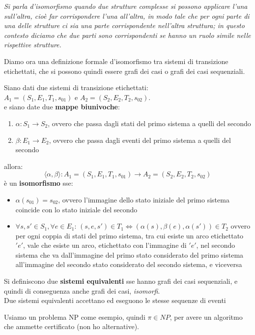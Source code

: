 \begin{shaded}
	\begin{center}
		\textit{Si parla d'isomorfismo quando due strutture complesse si possono
			applicare l'una sull'altra, cioè far corrispondere l'una all'altra, in modo
			tale che per ogni parte di una delle strutture ci sia una parte
			corrispondente nell'altra struttura; in questo contesto diciamo che due
			parti sono corrispondenti se hanno un ruolo simile nelle rispettive
		strutture.}
	\end{center}
	Diamo ora una definizione formale d'isomorfismo tra sistemi di transizione
	etichettati, che si possono quindi essere grafi dei casi o grafi dei casi
	sequenziali.
	\begin{definizione}
		Siano dati due sistemi di transizione etichettati:\\
		$A_1 = (S_1,E_1,T_1,s_{01})$ e $A_2 = (S_2 , E_2 , T_2 , s_{02})$.\\
		e siano date due \textbf{mappe biunivoche}:
		\begin{enumerate}
			\item $\alpha:S_1\to S_2$, ovvero che passa dagli stati del primo sistema a
			      quelli del secondo
			\item $\beta:E_1\to E_2$, ovvero che passa dagli eventi del primo sistema a
			      quelli del secondo
		\end{enumerate}
		allora:
		\[\langle \alpha,\beta\rangle:A_1= (S_1 , E_1 , T_1 ,s_{01})\to A_2 = (S_2 ,
			E_2 , T_2 , s_{02})\]
			è un \textbf{isomorfismo} sse:
			\begin{itemize}
				\item $\alpha(s_{01})=s_{02}$, ovvero l'immagine dello stato iniziale del
				      primo sistema coincide con lo stato iniziale del secondo
				\item $\forall s,s'\in S_1,\forall e\in E_1:\,(s,e,s')\in T_1
				      \Leftrightarrow (\alpha(s),\beta(e),\alpha(s'))\in T_2$ ovvero per ogni
				      coppia di stati del primo sistema, tra cui esiste un arco etichettato $ 'e' $,
				      vale che esiste un arco, etichettato con l'immagine di $ 'e' $, nel secondo
				      sistema che va dall'immagine del primo stato considerato del primo sistema
				      all'immagine del secondo stato considerato del secondo sistema, e viceversa
			\end{itemize}
			\end{definizione}
			\begin{definizione}
				Si definiscono due \textbf{sistemi equivalenti} sse hanno grafi dei casi
				sequenziali, e quindi di conseguenza anche grafi dei casi, \emph{isomorfi}.\\
				Due sistemi equivalenti accettano ed eseguono le stesse sequenze di eventi
			\end{definizione}
			\end{shaded}
			Usiamo un problema NP come esempio, quindi $\pi\in NP$, per avere un algoritmo che ammette certificato (non ho alternative).
